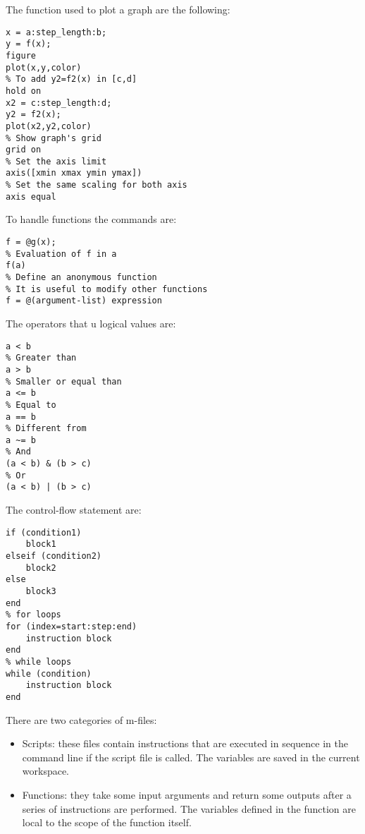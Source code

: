 \documentclass[12pt, a4paper]{report}
\newtheorem[style=M,bodystyle=\normalfont]{theorem}{Theorem}
\newtheorem[style=M,bodystyle=\normalfont]{corollary}{Corollary}
\newtheorem[style=M,bodystyle=\normalfont]{lemma}{Lemma}
\newtheorem[style=M,bodystyle=\normalfont]{definition}{Definition}
\begin{document}
    The function used to plot a graph are the following: 
    \begin{lstlisting}[frame=single, numbers=none, style=Matlab-bw]
% To plot y=f(x) in [a,b]
x = a:step_length:b;
y = f(x);   
figure         
plot(x,y,color)
% To add y2=f2(x) in [c,d]
hold on 
x2 = c:step_length:d;
y2 = f2(x);
plot(x2,y2,color)     
% Show graph's grid
grid on 
% Set the axis limit
axis([xmin xmax ymin ymax]) 
% Set the same scaling for both axis
axis equal 
    \end{lstlisting} 
    To handle functions the commands are: 
    \begin{lstlisting}[frame=single, numbers=none, style=Matlab-bw]
% Define a function handle to g(x)
f = @g(x);
% Evaluation of f in a
f(a) 
% Define an anonymous function
% It is useful to modify other functions
f = @(argument-list) expression
    \end{lstlisting} 
    The operators that u logical values are:  
    \begin{lstlisting}[frame=single, numbers=none, style=Matlab-bw]
% Smaller than
a < b     
% Greater than
a > b
% Smaller or equal than
a <= b   
% Equal to
a == b    
% Different from
a ~= b  
% And
(a < b) & (b > c)  
% Or   
(a < b) | (b > c)     
    \end{lstlisting} 
    The control-flow statement are: 
    \begin{lstlisting}[frame=single, numbers=none, style=Matlab-bw]
% if-then-else statements
if (condition1)
    block1
elseif (condition2)
    block2
else
    block3
end
% for loops
for (index=start:step:end)
    instruction block
end
% while loops
while (condition)
    instruction block
end
    \end{lstlisting}    
    There are two categories of m-files: 
    \begin{itemize}
        \item Scripts: these files contain instructions that are executed in sequence in the command line if the script file is called. 
            The variables are saved in the current workspace.
        \item Functions: they take some input arguments and return some outputs after a series of instructions are performed. 
            The variables defined in the function are local to the scope of the function itself.
    \end{itemize}

\newpage
\end{document}
